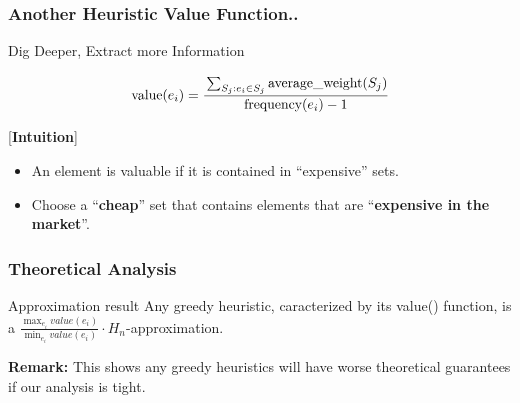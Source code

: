 \documentclass[xcolor=dvipsnames]{beamer}
\newlength\myheight
\newlength\mydepth
\newcommand*\inlinegraphics[1]{%
  \settototalheight\myheight{Xygp}%
  \settodepth\mydepth{Xygp}%
  \raisebox{-\mydepth}{\texttt{[image: \#1]}}%
}
\begin{document}
\begin{frame}
\frametitle{Another Heuristic Value Function..}
Dig Deeper, Extract more Information \inlinegraphics{excavators.eps}
\begin{minipage}{0.25\textwidth}
%
\end{minipage}%
\begin{minipage}{0.75\textwidth}
$$ \text{value}(e_i) = \cfrac{\sum_{S_j: e_i \in S_j} \text{average\_weight}(S_j)}{\text{frequency}(e_i)-1}$$
\end{minipage}
[\textbf{Intuition}]
\begin{itemize}
\item An element is valuable if it is contained in ``expensive'' sets.
\item Choose a ``\textbf{cheap}'' set that contains elements that are ``\textbf{expensive in the market}''.
\end{itemize}
\end{frame}

\begin{frame}
\frametitle{Theoretical Analysis}
\begin{block}{Approximation result}
Any greedy heuristic, caracterized by its value() function, is a $\displaystyle\frac{\displaystyle\max_{e_i} value(e_i)}{\displaystyle\min_{e_i} value(e_i)} \cdot H_n$-approximation.
\end{block}
\textbf{Remark:} This shows any greedy heuristics will have worse theoretical guarantees if our analysis is tight.
\end{frame}
\end{document}
